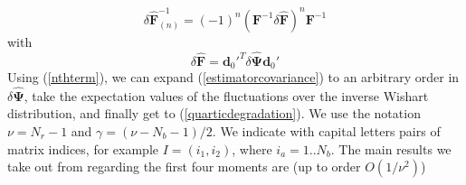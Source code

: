 \documentclass[reprint,aps,prd,superscriptaddress,showkeys,showpacs]{revtex4-1}
\newcommand{\bb}[1]{\mathbf{#1}}
\newcommand{\bbh}[1]{\mathbf{\hat{#1}}}
\begin{document}
\begin{equation}
\label{nthterm}
\delta\bbh{F}^{-1}_{(n)} = (-1)^{n}(\bb{F}^{-1}\delta\bbh{F})^n\bb{F}^{-1}
\end{equation}
%
with
\begin{equation}
\delta\bbh{F} = \bb{d}_0'^T\delta\bbh{\Psi}\bb{d}_0'
\end{equation}
%
Using (\ref{nthterm}), we can expand (\ref{estimatorcovariance}) to an arbitrary order in $\delta\bbh{\Psi}$, take the expectation values of the fluctuations over the inverse Wishart distribution, and finally get to (\ref{quarticdegradation}). We use the notation $\nu=N_r-1$ and $\gamma=(\nu-N_b-1)/2$. We indicate with capital letters pairs of matrix indices, for example $I=(i_1,i_2)$, where $i_a=1..N_b$. The main results we take out from \citep{MasumotoWishart} regarding the first four moments are (up to order $O(1/\nu^2)$)
\end{document}
